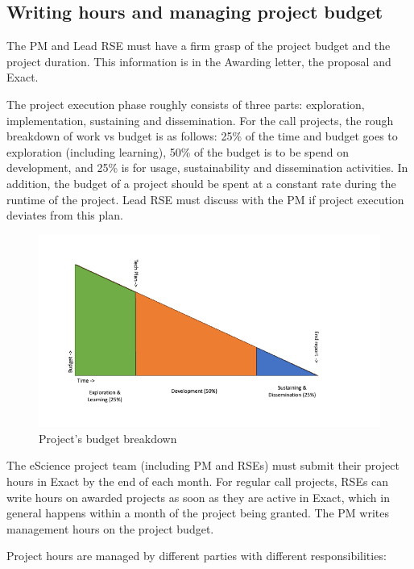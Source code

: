 \documentclass[11pt]{article}
\begin{document}
\subsection{Writing hours and managing project budget}
\label{sec:exec:budget}
The PM and Lead RSE must have a firm grasp of the project budget and the project duration. This information is in the
Awarding letter, the proposal and Exact.

The project execution phase roughly consists of three parts: exploration, implementation, sustaining and dissemination.
For the call projects, the rough breakdown of work vs budget is as follows: 25\% of the time and budget goes to
exploration (including learning), 50\% of the budget is to be spend on development, and 25\% is for usage,
sustainability and dissemination activities. In addition, the budget of a project should be spent at a constant rate
during the runtime of the project. Lead RSE must discuss with the PM if project execution deviates from this plan.

\begin{figure}[!h]
    \centering
    \includegraphics[scale=0.5]{img/budget-stages.png}
    \caption{Project's budget breakdown}
    \label{fig:project-budget}
\end{figure}

The eScience project team (including PM and RSEs) must submit their project hours in Exact by the end of each month. For
regular call projects, RSEs can write hours on awarded projects as soon as they are active in Exact, which in general
happens within a month of the project being granted. The PM writes management hours on the project budget.

Project hours are managed by different parties with different responsibilities:



\end{document}
